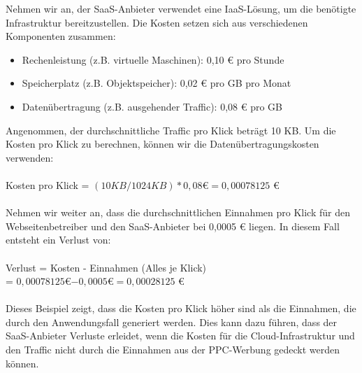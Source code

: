 Nehmen wir an, der SaaS-Anbieter verwendet eine IaaS-Lösung, um die benötigte Infrastruktur bereitzustellen. Die Kosten setzen sich aus verschiedenen Komponenten zusammen:
\begin{itemize}
\item Rechenleistung (z.B. virtuelle Maschinen): 0,10 € pro Stunde
\item Speicherplatz (z.B. Objektspeicher): 0,02 € pro GB pro Monat
\item Datenübertragung (z.B. ausgehender Traffic): 0,08 € pro GB
\end{itemize}
Angenommen, der durchschnittliche Traffic pro Klick beträgt 10 KB. Um die Kosten pro Klick zu berechnen, können wir die Datenübertragungskosten verwenden:
\\\\
Kosten pro Klick = $(10 KB / 1024 KB) * 0,08 $€$ = 0,00078125$ €
\\\\
Nehmen wir weiter an, dass die durchschnittlichen Einnahmen pro Klick für den Webseitenbetreiber und den SaaS-Anbieter bei 0,0005 € liegen. In diesem Fall entsteht ein Verlust von:
\\\\
Verlust = Kosten - Einnahmen (Alles je Klick) \\
= $0,00078125 $€$ - 0,0005 $€$ = 0,00028125$ €
\\\\
Dieses Beispiel zeigt, dass die Kosten pro Klick höher sind als die Einnahmen, die durch den Anwendungsfall generiert werden. Dies kann dazu führen, dass der SaaS-Anbieter Verluste erleidet, wenn die Kosten für die Cloud-Infrastruktur und den Traffic nicht durch die Einnahmen aus der PPC-Werbung gedeckt werden können.

